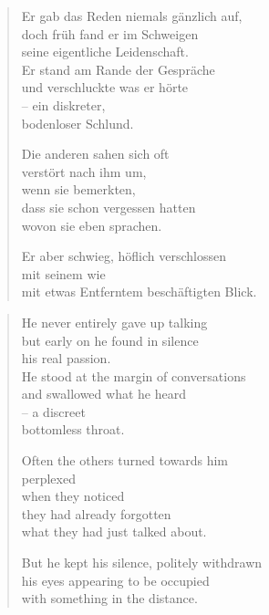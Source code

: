 
\cleartorecto


\begin{verse}
Er gab das Reden niemals gänzlich auf,\\
doch früh fand er im Schweigen\\
seine eigentliche Leidenschaft.\\
Er stand am Rande der Gespräche\\
und verschluckte was er hörte\\
-- ein diskreter,\\
bodenloser Schlund.

Die anderen sahen sich oft\\
verstört nach ihm um,\\
wenn sie bemerkten,\\
dass sie schon vergessen hatten\\
wovon sie eben sprachen.

Er aber schwieg, höflich verschlossen\\
mit seinem wie\\
mit etwas Entferntem beschäftigten Blick.
\end{verse}

\cleartoverso


\begin{verse}
He never entirely gave up talking\\
but early on he found in silence\\
his real passion.\\
He stood at the margin of conversations\\
and swallowed what he heard\\
-- a discreet\\
bottomless throat.

Often the others turned towards him\\
perplexed\\
when they noticed\\
they had already forgotten\\
what they had just talked about.

But he kept his silence, politely withdrawn\\
his eyes appearing to be occupied\\
with something in the distance.
\end{verse}

